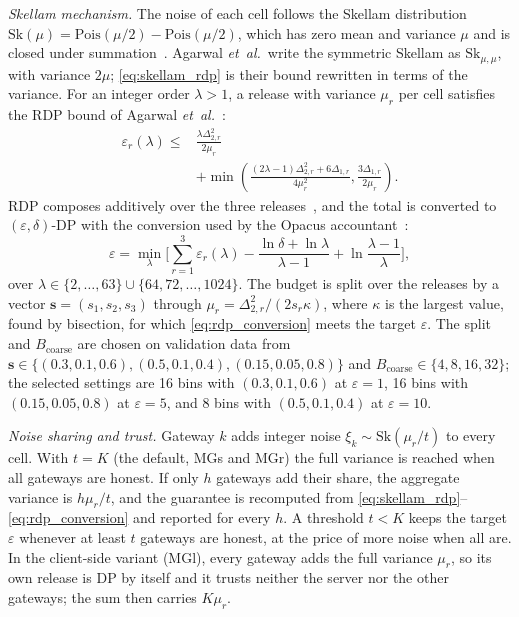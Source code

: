 \documentclass[conference]{IEEEtran}
\begin{document}
\textit{Skellam mechanism.} The noise of each cell follows the Skellam distribution $\mathrm{Sk}(\mu) = \mathrm{Pois}(\mu/2) - \mathrm{Pois}(\mu/2)$, which has zero mean and variance $\mu$ and is closed under summation~\cite{agarwal2021}. Agarwal \textit{et~al.}\ write the symmetric Skellam as $\mathrm{Sk}_{\mu,\mu}$, with variance $2\mu$; \eqref{eq:skellam_rdp} is their bound rewritten in terms of the variance. For an integer order $\lambda > 1$, a release with variance $\mu_r$ per cell satisfies the RDP bound of Agarwal \textit{et~al.}~\cite[Cor.~3.6]{agarwal2021}:
\begin{equation}
\begin{aligned}
\varepsilon_r(\lambda) \le{}& \frac{\lambda \Delta_{2,r}^2}{2\mu_r} \\
&+ \min\!\left( \frac{(2\lambda - 1)\Delta_{2,r}^2 + 6\Delta_{1,r}}{4\mu_r^2}, \frac{3\Delta_{1,r}}{2\mu_r} \right).
\end{aligned}
\label{eq:skellam_rdp}
\end{equation}
RDP composes additively over the three releases~\cite{mironov2017rdp}, and the total is converted to $(\varepsilon, \delta)$-DP with the conversion used by the Opacus accountant~\cite{yousefpour2021}:
\begin{equation}
\varepsilon = \min_{\lambda} \Big[ \sum_{r=1}^{3} \varepsilon_r(\lambda) - \frac{\ln \delta + \ln \lambda}{\lambda - 1} + \ln \frac{\lambda - 1}{\lambda} \Big],
\label{eq:rdp_conversion}
\end{equation}
over $\lambda \in \{2, \dots, 63\} \cup \{64, 72, \dots, 1024\}$. The budget is split over the releases by a vector $\mathbf{s} = (s_1, s_2, s_3)$ through $\mu_r = \Delta_{2,r}^2 / (2 s_r \kappa)$, where $\kappa$ is the largest value, found by bisection, for which \eqref{eq:rdp_conversion} meets the target $\varepsilon$. The split and $B_{\mathrm{coarse}}$ are chosen on validation data from $\mathbf{s} \in \{(0.3, 0.1, 0.6), (0.5, 0.1, 0.4), (0.15, 0.05, 0.8)\}$ and $B_{\mathrm{coarse}} \in \{4, 8, 16, 32\}$; the selected settings are 16 bins with $(0.3, 0.1, 0.6)$ at $\varepsilon = 1$, 16 bins with $(0.15, 0.05, 0.8)$ at $\varepsilon = 5$, and 8 bins with $(0.5, 0.1, 0.4)$ at $\varepsilon = 10$.

\textit{Noise sharing and trust.} Gateway $k$ adds integer noise $\xi_k \sim \mathrm{Sk}(\mu_r / t)$ to every cell. With $t = K$ (the default, MGs and MGr) the full variance is reached when all gateways are honest. If only $h$ gateways add their share, the aggregate variance is $h\mu_r/t$, and the guarantee is recomputed from \eqref{eq:skellam_rdp}--\eqref{eq:rdp_conversion} and reported for every $h$. A threshold $t < K$ keeps the target $\varepsilon$ whenever at least $t$ gateways are honest, at the price of more noise when all are. In the client-side variant (MGl), every gateway adds the full variance $\mu_r$, so its own release is DP by itself and it trusts neither the server nor the other gateways; the sum then carries $K\mu_r$.
\end{document}
